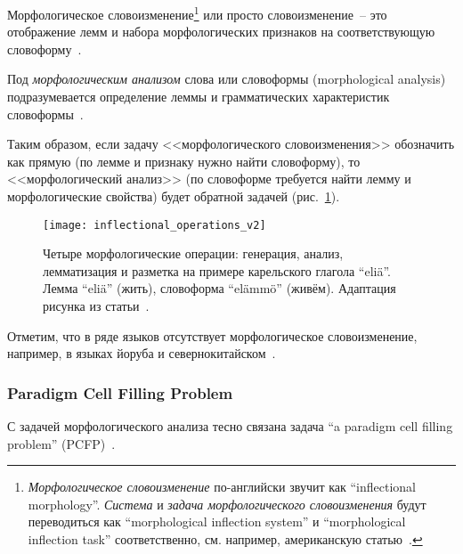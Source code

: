 Морфологическое словоизменение\footnote{%
    \emph{Морфологическое словоизменение} по-английски звучит как
    ``inflectional morphology''.
    \emph{Система} и \emph{задача морфологического словоизменения}
    будут переводиться как
    ``morphological inflection system'' и ``morphological inflection task'' соответственно,
    см. например, американскую статью~\cite{King2020seq2seqRussianMA}.
} или просто словоизменение~--
это отображение лемм и набора морфологических признаков
на соответствующую словоформу~\cite[2821]{Cruz-Anastasopoulos-Stump2020Chatino}.

Под \emph{морфологическим анализом} слова или словоформы (morphological analysis)
подразумевается определение леммы и
грамматических характеристик словоформы~\cite{MitreninaNikolaevLando2016}.

Таким образом, если задачу <<морфологического словоизменения>> обозначить как прямую
(по лемме и признаку нужно найти словоформу),
то <<морфологический анализ>> (по словоформе требуется найти
лемму и морфологические свойства) будет обратной задачей (рис.~\ref{fig:inflectional_operations}).

\begin{figure}
    \centering
    \texttt{[image: inflectional\_operations\_v2]}
    \caption[Четыре морфологические операции: генерация, анализ, лемматизация и разметка]{Четыре 
        морфологические операции: генерация, анализ, лемматизация и разметка 
        на примере карельского глагола ``eliä''\footnotemark.  
        Лемма ``eliä'' (жить), словоформа ``elämmö'' (живём). 
        Адаптация рисунка из статьи~\cite{Nicolai2020FineGraned}.} 
    \label{fig:inflectional_operations}
\end{figure}

Отметим, что в ряде языков отсутствует морфологическое словоизменение,
например, в языках йоруба и севернокитайском~\cite[2]{Vylomova2020SIGMORPHON}.



\subsubsection{Paradigm Cell Filling Problem}

С задачей морфологического анализа тесно связана задача
``a paradigm cell filling problem'' (PCFP)~\cite{Ackerman08PartsAndWholes}.



